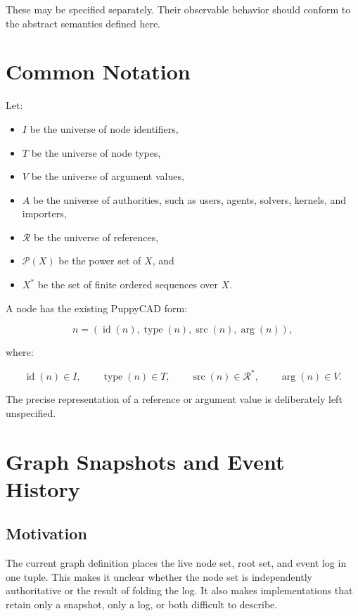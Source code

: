 \documentclass[11pt]{article}
\begin{document}
These may be specified separately. Their observable behavior should conform to
the abstract semantics defined here.

\section{Common Notation}

Let:

\begin{itemize}
  \item $I$ be the universe of node identifiers,
  \item $T$ be the universe of node types,
  \item $V$ be the universe of argument values,
  \item $A$ be the universe of authorities, such as users, agents, solvers,
    kernels, and importers,
  \item $\mathcal{R}$ be the universe of references,
  \item $\mathcal{P}(X)$ be the power set of $X$, and
  \item $X^*$ be the set of finite ordered sequences over $X$.
\end{itemize}

A node has the existing PuppyCAD form:

\[
n=(\operatorname{id}(n),\operatorname{type}(n),
   \operatorname{src}(n),\operatorname{arg}(n)),
\]

where:

\[
\operatorname{id}(n)\in I,\qquad
\operatorname{type}(n)\in T,\qquad
\operatorname{src}(n)\in\mathcal{R}^*,\qquad
\operatorname{arg}(n)\in V.
\]

The precise representation of a reference or argument value is deliberately
left unspecified.

\section{Graph Snapshots and Event History}

\subsection{Motivation}

The current graph definition places the live node set, root set, and event log
in one tuple. This makes it unclear whether the node set is independently
authoritative or the result of folding the log. It also makes implementations
that retain only a snapshot, only a log, or both difficult to describe.
\end{document}
